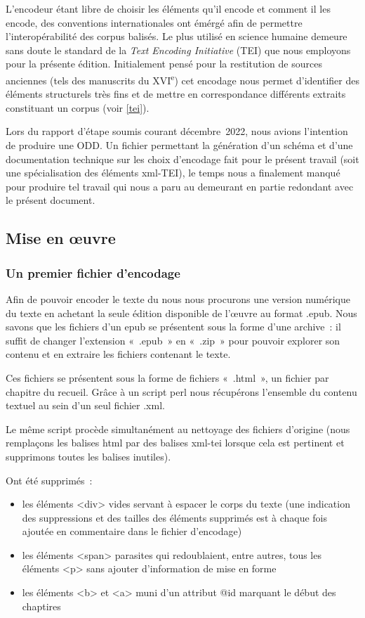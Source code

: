 \documentclass[12pt, a4paper]{article}
\begin{document}
L'encodeur étant libre de choisir les éléments qu'il encode et comment il les encode, des conventions internationales ont émérgé afin de permettre l'interopérabilité des corpus balisés. Le plus utilisé en science humaine demeure sans doute le standard de la \textit{Text Encoding Initiative} (TEI) que nous employons pour la présente édition. Initialement pensé pour la restitution de sources anciennes (tels des manuscrits du \textsc{XVI}\textsuperscript{e}) cet encodage nous permet d'identifier des éléments structurels très fins et de mettre en correspondance différents extraits constituant un corpus (voir \ref{tei}).

Lors du rapport d'étape soumis courant décembre~2022, nous avions l'intention de produire une ODD. Un fichier permettant la génération d'un schéma et d'une documentation technique sur les choix d'encodage fait pour le présent travail (soit une spécialisation des éléments xml-TEI), le temps nous a finalement manqué pour produire tel travail qui nous a paru au demeurant en partie redondant avec le présent document.


    \subsection{Mise en œuvre}


\subsubsection{Un premier fichier d'encodage}
\label{premier_enc}
Afin de pouvoir encoder le texte du \punr{} nous nous procurons une version numérique du texte en achetant la seule édition disponible de l'œuvre au format \go.epub\gf. Nous savons que les fichiers d'un epub se présentent sous la forme d'une archive~: il suffit de changer l'extension «~.epub~» en «~.zip~» pour pouvoir explorer son contenu et en extraire les fichiers contenant le texte.

Ces fichiers se présentent sous la forme de fichiers «~.html~», un fichier par chapitre du recueil. Grâce à un script perl nous récupérons l'ensemble du contenu textuel au sein d'un seul fichier .xml.

Le même script procède simultanément au nettoyage des fichiers d'origine (nous remplaçons les balises html par des balises xml-tei lorsque cela est pertinent et supprimons toutes les balises inutiles).

Ont été supprimés~:
\begin{itemize}
    \item les éléments <div> vides servant à espacer le corps du texte (une indication des suppressions et des tailles des éléments supprimés est à chaque fois ajoutée en commentaire dans le fichier d'encodage)
    \item les éléments <span> parasites qui redoublaient, entre autres, tous les éléments <p> sans ajouter d'information de mise en forme
    \item les éléments <b> et <a> muni d'un attribut @id marquant le début des chaptires
\end{itemize}
\end{document}
